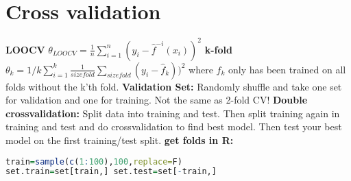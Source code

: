 \section{Cross validation}
\textbf{LOOCV} $\theta_{LOOCV} = \frac{1}{n}\sum_{i=1}^n(y_i - \hat f^{-i}(x_i))^2$
\textbf{k-fold} $\theta_k = 1/k\sum_{i=1}^k \frac{1}{size fold}\sum_{size fold}(y_i-\hat f_k))^2$ where $f_k$ only has been trained on all folds without the k'th fold. 
\textbf{Validation Set:} Randomly shuffle and take one set for validation and one for training. Not the same as 2-fold CV!
\textbf{Double crossvalidation: }Split data into training and test. Then split training again in training and test and do crossvalidation to find best model. Then test your best model on the first training/test split. 
\textbf{get folds in R: } \begin{lstlisting}[language=R]
train=sample(c(1:100),100,replace=F)
set.train=set[train,] set.test=set[-train,] \end{lstlisting}